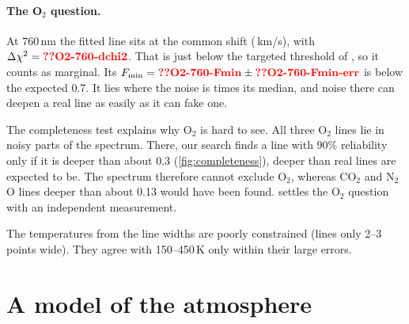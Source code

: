 \documentclass[aps,prd,twocolumn,nofootinbib,floatfix,superscriptaddress]{revtex4-2}
\begin{document}
\paragraph{The O$_2$ question.}
At 760\,nm the fitted line sits at the common shift (\,km/s), with $\Delta\chi^2=\val{O2-760-dchi2}$.
That is just below the targeted threshold of , so it counts as marginal.
Its $F_{\min}=\val{O2-760-Fmin}\pm\val{O2-760-Fmin-err}$ is below the expected 0.7.
It lies where the noise is  times its median, and noise there can deepen a real line as easily as it can fake one.

The completeness test explains why O$_2$ is hard to see.
All three O$_2$ lines lie in noisy parts of the spectrum.
There, our search finds a line with 90\% reliability only if it is deeper than about 0.3 (\cref{fig:completeness}), deeper than real lines are expected to be.
The spectrum therefore cannot exclude O$_2$, whereas CO$_2$ and N$_2$O lines deeper than about 0.13 would have been found.
 settles the O$_2$ question with an independent measurement.

The temperatures from the line widths are poorly constrained (lines only 2--3 points wide).
They agree with 150--450\,K only within their large errors.


\section{A model of the atmosphere}\label{sec:atmos}
\end{document}
